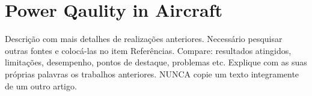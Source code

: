 \section{Power Qaulity in Aircraft}

Descrição com mais detalhes de realizações anteriores. Necessário pesquisar outras fontes e colocá-las no item Referências.
 Compare: resultados atingidos, limitações, desempenho, pontos de destaque, problemas etc. Explique com as suas próprias palavras os trabalhos anteriores. 
NUNCA copie um texto integramente de um outro artigo.
